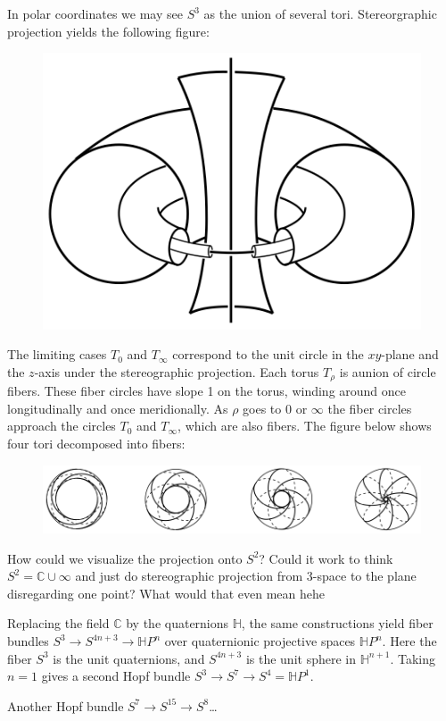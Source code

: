 \documentclass{article}
\newcommand{\C}{\mathbb{C}}
\renewcommand{\H}{\mathbb{H}}
\begin{document}
\begin{example}
	In polar coordinates we may see $S^3$ as the union of several tori. Stereorgraphic projection yields the following figure:
	\begin{figure}[H]
		\centering
		\includegraphics[width=0.5\linewidth]{hopf-bundle}
		\label{fig:hopf-bundle}
	\end{figure}
	The limiting cases $T_0$ and $T_\infty$ correspond to the unit circle in the $xy$-plane and the $z$-axis under the stereographic projection.	Each torus $T_\rho$ is aunion of circle fibers. These fiber circles have slope 1 on the torus, winding around once longitudinally and once meridionally. As $\rho$ goes to $0$ or $\infty$ the fiber circles approach the circles $T_0$ and $T_\infty$, which are also fibers. The figure below shows four tori decomposed into fibers:
	\begin{figure}[H]
		\centering
		\includegraphics[width=0.9\linewidth]{hopf-bundle2}
		\label{fig:hopf-bundle2}
	\end{figure}
	{\color{persiangreen}How could we visualize the projection onto $S^2$? Could it work to think $S^2=\C\cup\infty$ and just do stereographic projection from 3-space to the plane disregarding one point? What would that even mean hehe}
	
	Replacing the field $\C$ by the quaternions $\H$, the same constructions yield fiber bundles $S^3\to S^{4n+3}\to\H P^{n}$ over quaternionic projective spaces $\H P^n$. Here the fiber $S^3$ is the unit quaternions, and $S^{4n+3}$ is the unit sphere in $\H^{n+1}$. Taking $n=1$ gives a second Hopf bundle $S^3\to S^7\to S^4=\H P^1$.
	
	Another Hopf bundle $S^7\to S^{15}\to S^8$…
\end{example}
\end{document}
